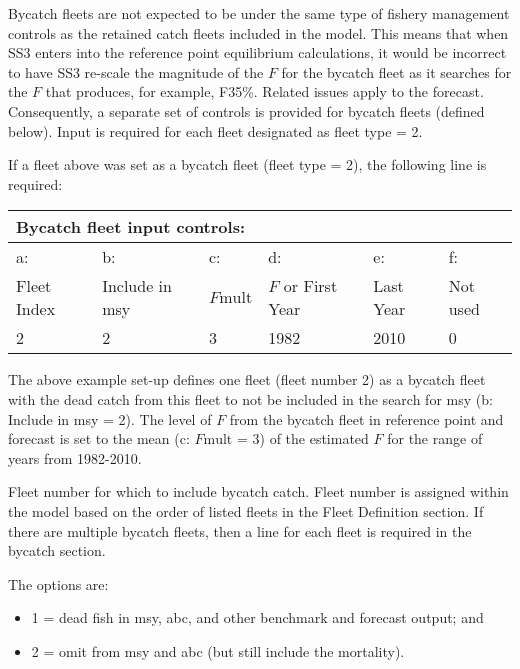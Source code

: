 Bycatch fleets are not expected to be under the same type of fishery management controls as the retained catch fleets included in the model. This means that when SS3 enters into the reference point equilibrium calculations, it would be incorrect to have SS3 re-scale the magnitude of the $F$ for the bycatch fleet as it searches for the $F$ that produces, for example, F35\%. Related issues apply to the forecast. Consequently, a separate set of controls is provided for bycatch fleets (defined below). Input is required for each fleet designated as fleet type = 2.

\noindent If a fleet above was set as a bycatch fleet (fleet type = 2), the following line is required: 
\begin{center}
	\vspace*{-\baselineskip}
	\begin{tabular}{p{2.25cm} p{2.5cm} p{2.25cm} p{2.5cm} p{2.5cm} p{2cm}}

		\multicolumn{6}{l}{Bycatch fleet input controls:} \\
		\hline
		a: 			  & b:  			     & c:             & d:                & e:        & f: \Tstrut\\
		Fleet Index   & Include in \gls{msy} & $F\text{mult}$ & $F$ or First Year & Last Year & Not used \Bstrut\\					
		\hline
		2 & 2 & 3 & 1982 & 2010 & 0 \Tstrut\Bstrut\\
		\hline		
	\end{tabular}
\end{center}

The above example set-up defines one fleet (fleet number 2) as a bycatch fleet with the dead catch from this fleet to not be included in the search for \gls{msy} (b: Include in \gls{msy} = 2). The level of $F$ from the bycatch fleet in reference point and forecast is set to the mean (c: $F\text{mult}$ = 3) of the estimated $F$ for the range of years from 1982-2010.  


Fleet number for which to include bycatch catch. Fleet number is assigned within the model based on the order of listed fleets in the Fleet Definition section. If there are multiple bycatch fleets, then a line for each fleet is required in the bycatch section.


The options are:	  
\begin{itemize}
  	\item 1 = dead fish in \gls{msy}, \gls{abc}, and other benchmark and forecast output; and
  	\item 2 = omit from \gls{msy} and \gls{abc} (but still include the mortality).
\end{itemize}

